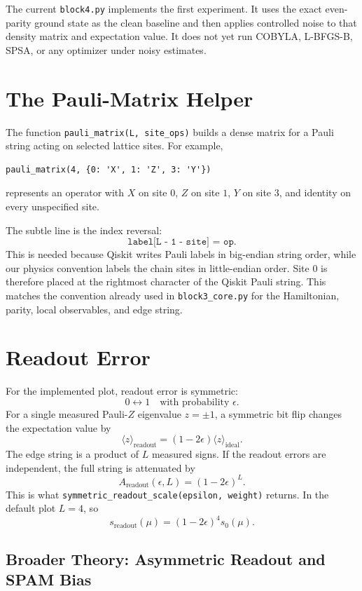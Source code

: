 \documentclass[11pt]{article}
\begin{document}
The current \texttt{block4.py} implements the first experiment. It uses the exact even-parity ground state as the clean baseline and then applies controlled noise to that density matrix and expectation value. It does not yet run COBYLA, L-BFGS-B, SPSA, or any optimizer under noisy estimates.

\section{The Pauli-Matrix Helper}

The function \texttt{pauli\_matrix(L, site\_ops)} builds a dense matrix for a Pauli string acting on selected lattice sites. For example,
\begin{verbatim}
pauli_matrix(4, {0: 'X', 1: 'Z', 3: 'Y'})
\end{verbatim}
represents an operator with $X$ on site $0$, $Z$ on site $1$, $Y$ on site $3$, and identity on every unspecified site.

The subtle line is the index reversal:
\[
  \texttt{label[L - 1 - site] = op}.
\]
This is needed because Qiskit writes Pauli labels in big-endian string order, while our physics convention labels the chain sites in little-endian order. Site $0$ is therefore placed at the rightmost character of the Qiskit Pauli string. This matches the convention already used in \texttt{block3\_core.py} for the Hamiltonian, parity, local observables, and edge string.

\section{Readout Error}

For the implemented plot, readout error is symmetric:
\[
  0 \leftrightarrow 1 \quad \text{with probability } \epsilon.
\]
For a single measured Pauli-$Z$ eigenvalue $z=\pm 1$, a symmetric bit flip changes the expectation value by
\[
  \langle z\rangle_{\mathrm{readout}} = (1-2\epsilon)\langle z\rangle_{\mathrm{ideal}}.
\]
The edge string is a product of $L$ measured signs. If the readout errors are independent, the full string is attenuated by
\[
  A_{\mathrm{readout}}(\epsilon,L)=(1-2\epsilon)^L.
\]
This is what \texttt{symmetric\_readout\_scale(epsilon, weight)} returns. In the default plot $L=4$, so
\[
  s_{\mathrm{readout}}(\mu)=(1-2\epsilon)^4s_0(\mu).
\]

\subsection{Broader Theory: Asymmetric Readout and SPAM Bias}
\end{document}
